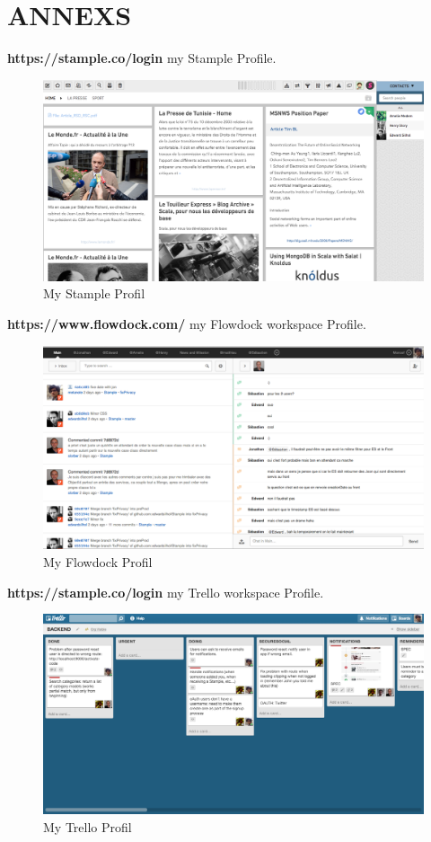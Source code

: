 \chapter{ANNEXS}

\textbf{https://stample.co/login} my Stample Profile.
\begin{figure}[H]
        \centering
                \centering
                \includegraphics[width=\textwidth]{Stample.png}
		\caption{My Stample Profil}

               
\end{figure}
\newpage
\textbf{https://www.flowdock.com/} my Flowdock workspace Profile.
\begin{figure}[H]
        \centering
                \centering
                \includegraphics[width=\textwidth]{Flowdock.png}
               \caption{My Flowdock Profil}

\end{figure}
\textbf{https://stample.co/login} my Trello workspace Profile.
\begin{figure}[H]
        \centering
                \centering
                \includegraphics[width=\textwidth]{trello.png}
               	\caption{My Trello Profil}

\end{figure}
